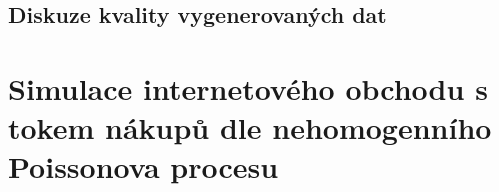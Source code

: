 \documentclass[12pt]{article}
\begin{document}
\subsection{Diskuze kvality vygenerovaných dat}

\section{ Simulace internetového obchodu s tokem nákupů dle nehomogenního Poissonova procesu}
\end{document}
